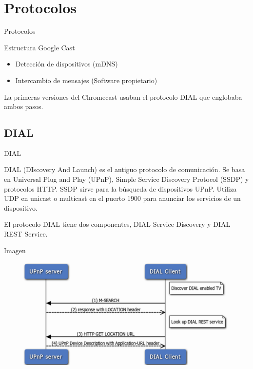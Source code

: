 \section{Protocolos}

\begin{frame}{Protocolos}
	\begin{block}{Estructura Google Cast}
		\begin{itemize}
			\item Detección de dispositivos (mDNS)
			\item Intercambio de mensajes (Software propietario)
		\end{itemize}
	\end{block}
	
	\begin{block}{ }
		La primeras versiones del Chromecast usaban el protocolo DIAL que englobaba ambos pasos.		
	\end{block}
\end{frame}


\subsection{DIAL}
\begin{frame}{DIAL}
	\begin{block}{ }
		DIAL (DIscovery And Launch) es el antiguo protocolo de comunicación. 
		Se basa en Universal Plug and Play (UPnP), Simple Service Discovery Protocol (SSDP) y protocolos HTTP. 
		SSDP sirve para la búsqueda de dispositivos UPnP. 
		Utiliza UDP en unicast o multicast en el puerto 1900 para anunciar los servicios de un dispositivo.
	\end{block}
	
	\begin{block}{ }
		El protocolo DIAL tiene dos componentes, DIAL Service Discovery y DIAL REST Service.
	\end{block}
\end{frame}



\begin{frame}{Imagen}
	\begin{figure}[H]
		\centering
		\includegraphics[width=1\textwidth]{./Imagenes/dial.png}
		\label{fig:DIAL}
	\end{figure}
\end{frame}

